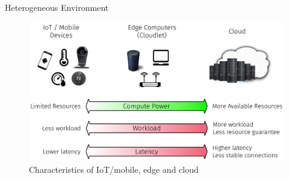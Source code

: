 \begin{frame}{Heterogeneous Environment}
  \vspace{1em}
  \begin{figure}
    \centering
    \includegraphics[width=0.95\linewidth]{figures/heterogeneous.pdf}
    \caption{Characteristics of IoT/mobile, edge and cloud}
  \end{figure}
\end{frame}

